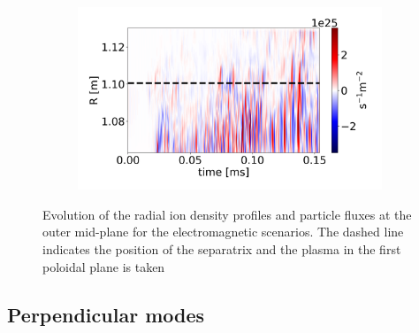 \begin{figure}[H]
\begin{subfigure}[t]{0.45\textwidth}
	\end{subfigure}
	\begin{subfigure}[t]{0.45\textwidth}
		\centering
		\includegraphics[width=1\textwidth]{schemes/plotOMPtime_spec1_fluxn_psi_flutter.jpg}
	\end{subfigure}
	\caption{Evolution of the radial ion density profiles and particle fluxes at the outer mid-plane for the electromagnetic scenarios. The dashed line indicates the position of the separatrix and the plasma in the first poloidal plane is taken}
	\label{fig:CIRC_EM_OMPevolution_n}
\end{figure}

\subsection{Perpendicular modes}
\label{sec:turbulentProfiles_CIRCmodal}


